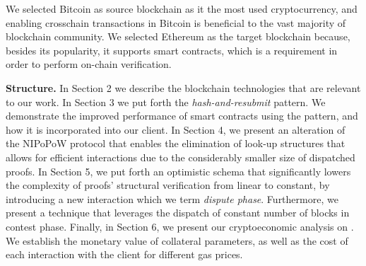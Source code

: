 We selected Bitcoin as source blockchain as it the most used cryptocurrency,
and enabling crosschain transactions in Bitcoin is beneficial to the vast
majority of blockchain community. We selected Ethereum as the target blockchain
because, besides its popularity, it supports smart contracts, which is a
requirement in order to perform on-chain verification.
\noindent

\textbf{Structure.} In Section 2 we describe the blockchain technologies that
are relevant to our work. In Section 3 we put forth the
\emph{hash-and-resubmit} pattern. We demonstrate the improved performance of
smart contracts using the pattern, and how it is incorporated into our
client. In Section 4, we present an alteration of the NIPoPoW protocol that
enables the elimination of look-up structures that allows for efficient
interactions due to the considerably smaller size of dispatched proofs. In
Section 5, we put forth an optimistic schema that significantly lowers the
complexity of proofs' structural verification from linear to constant, by
introducing a new interaction which we term \emph{dispute phase}. Furthermore,
we present a technique that leverages the dispatch of constant number of blocks
in contest phase. Finally, in Section 6, we present our cryptoeconomic analysis
on \name. We establish the monetary value of collateral parameters, as well
as the cost of each interaction with the client for different gas prices.
